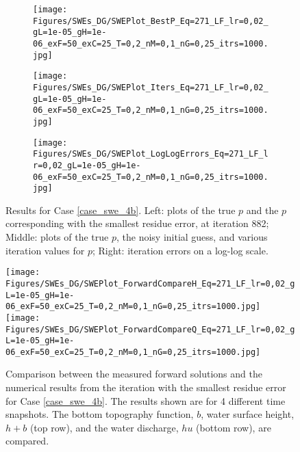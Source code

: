\begin{figure}
\begin{subfigure}[t]{0.32\textwidth}
    \centering
    \texttt{[image: Figures/SWEs\_DG/SWEPlot\_BestP\_Eq=271\_LF\_lr=0,02\_gL=1e-05\_gH=1e-06\_exF=50\_exC=25\_T=0,2\_nM=0,1\_nG=0,25\_itrs=1000.jpg]}
\end{subfigure}
\begin{subfigure}[t]{0.32\textwidth}
    \centering
    \texttt{[image: Figures/SWEs\_DG/SWEPlot\_Iters\_Eq=271\_LF\_lr=0,02\_gL=1e-05\_gH=1e-06\_exF=50\_exC=25\_T=0,2\_nM=0,1\_nG=0,25\_itrs=1000.jpg]}
\end{subfigure}
\begin{subfigure}[t]{0.32\textwidth}
    \centering
    \texttt{[image: Figures/SWEs\_DG/SWEPlot\_LogLogErrors\_Eq=271\_LF\_lr=0,02\_gL=1e-05\_gH=1e-06\_exF=50\_exC=25\_T=0,2\_nM=0,1\_nG=0,25\_itrs=1000.jpg]}
\end{subfigure}
\caption{Results for Case \eqref{case_swe_4b}. Left: plots of the true $p$ and the $p$ corresponding with the smallest residue error, at iteration 882; Middle: plots of the true $p$, the noisy initial guess, and various iteration values for $p$; Right: iteration errors on a log-log scale.}
    \label{fig:swe_4B}
\end{figure}

\begin{figure}
    \centering
    \texttt{[image: Figures/SWEs\_DG/SWEPlot\_ForwardCompareH\_Eq=271\_LF\_lr=0,02\_gL=1e-05\_gH=1e-06\_exF=50\_exC=25\_T=0,2\_nM=0,1\_nG=0,25\_itrs=1000.jpg]}
    \texttt{[image: Figures/SWEs\_DG/SWEPlot\_ForwardCompareQ\_Eq=271\_LF\_lr=0,02\_gL=1e-05\_gH=1e-06\_exF=50\_exC=25\_T=0,2\_nM=0,1\_nG=0,25\_itrs=1000.jpg]}
    \caption{Comparison between the measured forward solutions and the numerical results from the iteration with the smallest residue error for Case \eqref{case_swe_4b}. The results shown are for 4 different time snapshots. The bottom topography function, $b$, water surface height, $h+b$ (top row), and the water discharge, $hu$ (bottom row), are compared.}
    \label{fig:swe_4B_2}
\end{figure}


